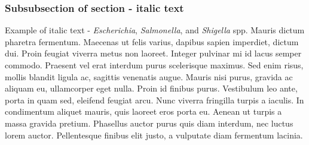 \subsubsection{Subsubsection of section - italic text}
Example of italic text - {\it Escherichia}, {\it Salmonella}, and {\it Shigella} spp. Mauris dictum pharetra fermentum. Maecenas ut felis varius, dapibus sapien imperdiet, dictum dui. Proin feugiat viverra metus non laoreet. Integer pulvinar mi id lacus semper commodo. Praesent vel erat interdum purus scelerisque maximus. Sed enim risus, mollis blandit ligula ac, sagittis venenatis augue. Mauris nisi purus, gravida ac aliquam eu, ullamcorper eget nulla. Proin id finibus purus. Vestibulum leo ante, porta in quam sed, eleifend feugiat arcu. Nunc viverra fringilla turpis a iaculis. In condimentum aliquet mauris, quis laoreet eros porta eu. Aenean ut turpis a massa gravida pretium. Phasellus auctor purus quis diam interdum, nec luctus lorem auctor. Pellentesque finibus elit justo, a vulputate diam fermentum lacinia. 